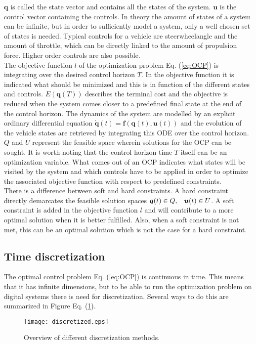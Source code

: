 $\bm{q}$ is called the state vector and contains all the states of the system. $\bm{u}$ is the control vector containing the controls. In theory the amount of states of a system can be infinite, but in order to sufficiently model a system, only a well chosen set of states is needed. Typical controls for a vehicle are steerwheelangle and the amount of throttle, which can be directly linked to the amount of propulsion force. Higher order controls are also possible.\\
The objective function $l$ of the optimization problem Eq. (\ref{eq:OCP}) is integrating over the desired control horizon $T$. In the objective function it is indicated what should be minimized and this is in function of the different states and controls. $E(\bm{q}(T))$ describes the terminal cost and the objective is reduced when the system comes closer to a predefined final state at the end of the control horizon.
The dynamics of the system are modelled by an explicit ordinary differential equation $\bm{\dot{q}}(t) = \bm{f}(\bm{q}(t), \bm{u}(t))$ and the evolution of the vehicle states are retrieved by integrating this ODE over the control horizon.
$Q$ and $U$ represent the feasible space wherein solutions for the OCP can be sought. It is worth noting that the control horizon time $T$ itself can be an optimization variable. What comes out of an OCP indicates what states will be visited by the system and which controls have to be applied in order to optimize the associated objective function with respect to predefined constraints. \cite{Panos_opti}\\ 

There is a difference between soft and hard constraints. A hard constraint directly demarcates the feasible solution spaces $\bm{q}(t)\in Q,\hspace{3 mm} \bm{u}(t)\in U$. A soft constraint is added in the objective function $l$ and will contribute to a more optimal solution when it is better fulfilled. Also, when a soft constraint is not met, this can be an optimal solution which is not the case for a hard constraint. \cite{Yankov} \\

\subsection{Time discretization}
\label{s:time_dis}
The optimal control problem Eq. (\ref{eq:OCP}) is continuous in time. This means that it has infinite dimensions, but to be able to run the optimization problem on digital systems there is need for discretization. Several ways to do this are summarized in Figure Eq. (\ref{fig:discretization_m}).\cite{Gillis2019}
\begin{figure}[htp]
	\centering
	\texttt{[image: discretized.eps]}
	\caption{Overview of different discretization methods.}
	\label{fig:discretization_m}
\end{figure}

